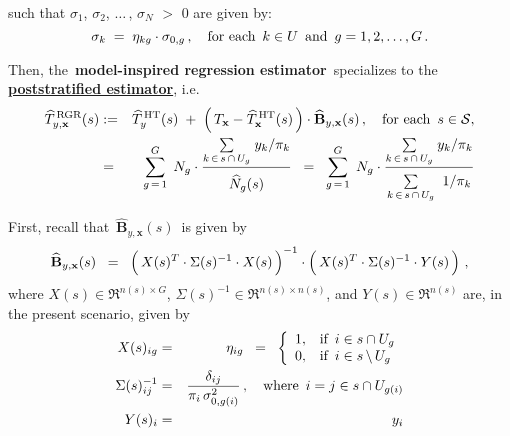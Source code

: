 \begin{example}
\begin{enumerate}
	such that
	$\sigma_{1}$, $\sigma_{2}$, $\ldots$\,, $\sigma_{N}$ $>$ $0$ are given by:
	\begin{equation*}
	\sigma_{k} \; = \; \eta_{kg}\cdot\sigma_{0,g}\,,
	\quad\textnormal{for each \,$k \in U$\, and \,$g = 1,2,\ldots,G$}\,.
	\end{equation*}
\end{enumerate}
\renewcommand{\theenumi}{\roman{enumi}}
\renewcommand{\labelenumi}{\textnormal{(\theenumi)}$\;\;$}
Then, the \,\textbf{model-inspired regression estimator}\,
specializes to the \,\underline{\textbf{poststratified estimator}}, i.e.
\begin{eqnarray*}
\widehat{T}^{\,\textnormal{RGR}}_{y,\mathbf{x}}(s)
& := &
	\widehat{T}^{\,\textnormal{HT}}_{y}(s)
	\; + \;
	\left(\,T_{\mathbf{x}} - \widehat{T}^{\,\textnormal{HT}}_{\mathbf{x}}(s) \,\right)
	\cdot
	\widehat{\mathbf{B}}_{y,\mathbf{x}}(s)\,,
	\quad\textnormal{for each \,$s \in \mathcal{S}$},
\\
& = &
	\overset{G}{\underset{g\,=\,1}{\sum}}\;\, N_{g}
	\cdot
	\dfrac{
		\underset{k\,\in\,s\,\cap\,U_{g}}{\sum}\;y_{k}/\pi_{k}
		}{
		\overset{{\color{white}.}}{\widehat{N}_{g}(s)}
		}
\;\; = \;\;
	\overset{G}{\underset{g\,=\,1}{\sum}}\;\, N_{g}
	\cdot
	\dfrac{
		\underset{k\,\in\,s\,\cap\,U_{g}}{\sum}\;y_{k}/\pi_{k}
		}{
		\underset{k\,\in\,s\,\cap\,U_{g}}{\overset{{\color{white}.}}{\sum}}\;\;1/\pi_{k}
		}
\end{eqnarray*}
\end{example}
\proof
First, recall that \,$\widehat{\mathbf{B}}_{y,\mathbf{x}}(s)$\, is given by
\begin{equation*}
\widehat{\mathbf{B}}_{y,\mathbf{x}}(s)
\;\; = \;\;
	\left(\,X(s)^{T} \overset{{\color{white}!}}{\cdot} \Sigma(s)^{-1} \cdot X(s)\,\right)^{-1}
	\cdot
	\left(\,X(s)^{T} \overset{{\color{white}!}}{\cdot} \Sigma(s)^{-1} \cdot Y(s) \,\right)\,,
\end{equation*}
where $X(s) \in \Re^{n(s) \times G}$, $\Sigma(s)^{-1} \in \Re^{n(s) \times n(s)}$, and $Y(s) \in \Re^{n(s)}$
are, in the present scenario, given by
\begin{eqnarray*}
X(s)_{ig}
& = &
	\eta_{ig}
\;\; = \;\;
	\left\{\begin{array}{cl}
		1, &  \textnormal{if \,$i \in s \cap U_{g}$}
		\\
		0, & \textnormal{if \,$i \in s\,\backslash\,U_{g}$}
	\end{array}\right.
\\
\Sigma(s)^{-1}_{ij}
& = &
	\dfrac{\delta_{ij}}{\pi_{i}\,\sigma^{2}_{0,g(i)}}\,,
	\quad
	\textnormal{where \,$i = j \in s \cap U_{g(i)}$}
\\
Y(s)_{i}
& = &
	y_{i}
\end{eqnarray*}

